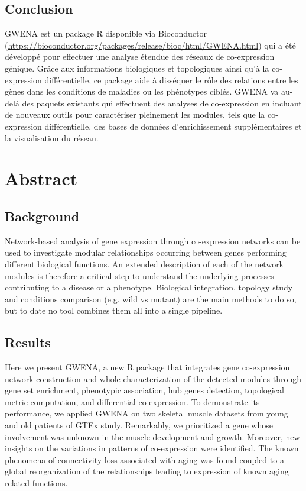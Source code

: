 \subsection{Conclusion}
GWENA est un package R disponible via Bioconductor (\url{https://bioconductor.org/packages/release/bioc/html/GWENA.html}) qui a été développé pour effectuer une analyse étendue des réseaux de co-expression génique. Grâce aux informations biologiques et topologiques ainsi qu'à la co-expression différentielle, ce package aide à disséquer le rôle des relations entre les gènes dans les conditions de maladies ou les phénotypes ciblés. GWENA va au-delà des paquets existants qui effectuent des analyses de co-expression en incluant de nouveaux outils pour caractériser pleinement les modules, tels que la co-expression différentielle, des bases de données d'enrichissement supplémentaires et la visualisation du réseau.


\section{Abstract}
\subsection{Background}
Network-based analysis of gene expression through co-expression networks can be used to investigate modular relationships occurring between genes performing different biological functions. An extended description of each of the network modules is therefore a critical step to understand the underlying processes contributing to a disease or a phenotype. Biological integration, topology study and conditions comparison (e.g. wild vs mutant) are the main methods to do so, but to date no tool combines them all into a single pipeline.

\subsection{Results}
Here we present GWENA, a new R package that integrates gene co-expression network construction and whole characterization of the detected modules through gene set enrichment, phenotypic association, hub genes detection, topological metric computation, and differential co-expression. To demonstrate its performance, we applied GWENA on two skeletal muscle datasets from young and old patients of GTEx study. Remarkably, we prioritized a gene whose involvement was unknown in the muscle development and growth. Moreover, new insights on the variations in patterns of co-expression were identified. The known phenomena of connectivity loss associated with aging was found coupled to a global reorganization of the relationships leading to expression of known aging related functions.


